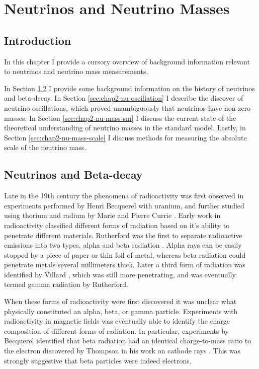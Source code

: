 
\chapter{Neutrinos and Neutrino Masses}

\section{Introduction}

In this chapter I provide a cursory overview of background information relevant to neutrinos and neutrino mass measurements. 

In Section \ref{sec:chap2-nu-history} I provide some background information on the history of neutrinos and beta-decay. In Section \ref{sec:chap2-nu-oscillation} I describe the discover of neutrino oscillations, which proved unambiguously that neutrinos have non-zero masses. In Section \ref{sec:chap2-nu-mass-sm} I discuss the current state of the theoretical understanding of neutrino masses in the standard model. Lastly, in Section \ref{sec:chap2-nu-mass-scale} I discuss methods for measuring the absolute scale of the neutrino mass.

\section{Neutrinos and Beta-decay}
\label{sec:chap2-nu-history}
Late in the 19th century the phenomena of radioactivity was first observed in experiments performed by Henri Becquerel with uranium, and further studied using thorium and radium by Marie and Pierre Currie \cite{nuclear_physics, curie}. Early work in radioactivity classified different forms of radiation based on it's ability to penetrate different materials. Rutherford was the first to separate radioactive emissions into two types, alpha and beta radiation \cite{rutherford_rad_types}. Alpha rays can be easily stopped by a piece of paper or thin foil of metal, whereas beta radiation could penetrate metals several millimeters thick. Later a third form of radiation was identified by Villard \cite{villard}, which was still more penetrating, and was eventually termed gamma radiation by Rutherford. 

When these forms of radioactivity were first discovered it was unclear what physically constituted an alpha, beta, or gamma particle. Experiments with radioactivity in magnetic fields was eventually able to identify the charge composition of different forms of radiation. In particular, experiments by Becquerel identified that beta radiation had an identical charge-to-mass ratio to the electron discovered by Thompson in his work on cathode rays \cite{Becquerel_beta_electron}. This was strongly suggestive that beta particles were indeed electrons.

